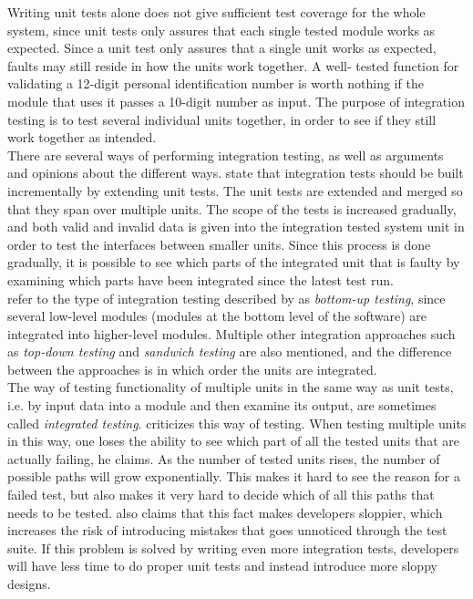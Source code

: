 Writing unit tests alone does not give sufficient test coverage for the
whole system, since unit tests only assures that each single tested
module works as expected. Since a unit test only assures that a single
unit works as expected, faults may still reside in how the units work
together. A well- tested function for validating a 12-digit personal
identification number is worth nothing if the module that uses it passes
a 10-digit number as input. The purpose of integration testing is to
test several individual units together, in order to see if they still
work together as intended.\\

There are several ways of performing integration testing, as well as
arguments and opinions about the different ways. \citet{book:adp} state
that integration tests should be built incrementally by extending unit
tests. The unit tests are extended and merged so that they span over
multiple units. The scope of the tests is increased gradually, and both
valid and invalid data is given into the integration tested system unit
in order to test the interfaces between smaller units. Since this
process is done gradually, it is possible to see which parts of the
integrated unit that is faulty by examining which parts have been
integrated since the latest test run.\\

\citet{book:pfleeger} refer to the type of integration testing described
by \citeauthor{book:adp} as \emph{bottom-up testing}, since several
low-level modules (modules at the bottom level of the software) are
integrated into higher-level modules. Multiple other integration
approaches such as \emph{top-down testing} and \emph{sandwich testing}
are also mentioned, and the difference between the approaches is in which
order the units are integrated.\\

The way of testing functionality of multiple units in the same way as
unit tests, i.e. by input data into a module and then examine its
output, are sometimes called \emph{integrated testing}.
\citet{video:integrated_scam} criticizes this way of testing. When
testing multiple units in this way, one loses the ability to see which
part of all the tested units that are actually failing, he claims. As
the number of tested units rises, the number of possible paths will grow
exponentially. This makes it hard to see the reason for a failed test,
but also makes it very hard to decide which of all this paths that needs
to be tested. \citeauthor{video:integrated_scam} also claims that this
fact makes developers sloppier, which increases the risk of introducing
mistakes that goes unnoticed through the test suite. If this problem is
solved by writing even more integration tests, developers will have less
time to do proper unit tests and instead introduce more sloppy
designs.\\

